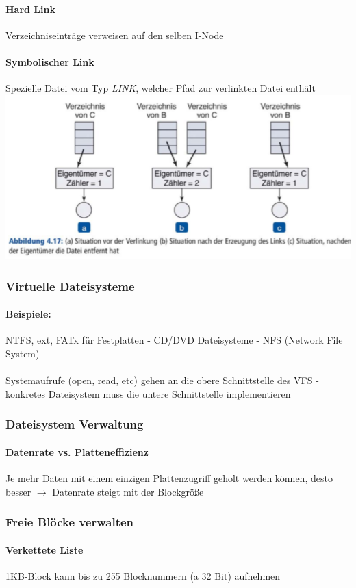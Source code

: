 \documentclass[11pt,a4paper,landscape]{article}
\begin{document}
\begin{multicols*}{3}
	\paragraph{Hard Link} Verzeichniseinträge verweisen auf den selben I-Node
	\paragraph{Symbolischer Link} Spezielle Datei vom Typ \textit{LINK}, welcher Pfad zur verlinkten Datei enthält\\
	\includegraphics[width=0.8\columnwidth]{link}
	\subsubsection{Virtuelle Dateisysteme}
	\paragraph{Beispiele:} NTFS, ext, FATx für Festplatten - CD/DVD Dateisysteme - NFS (Network File System)\\\\
	Systemaufrufe (open, read, etc) gehen an die obere Schnittstelle des VFS - konkretes Dateisystem muss die untere Schnittstelle implementieren
	\subsubsection{Dateisystem Verwaltung}
	\paragraph{Datenrate vs. Platteneffizienz} Je mehr Daten mit einem einzigen Plattenzugriff geholt werden können, desto besser $\rightarrow$ Datenrate steigt mit der Blockgröße
	\subsubsection{Freie Blöcke verwalten}
	\paragraph{Verkettete Liste} 1KB-Block kann bis zu 255 Blocknummern (a 32 Bit) aufnehmen

\end{multicols*}
\end{document}
